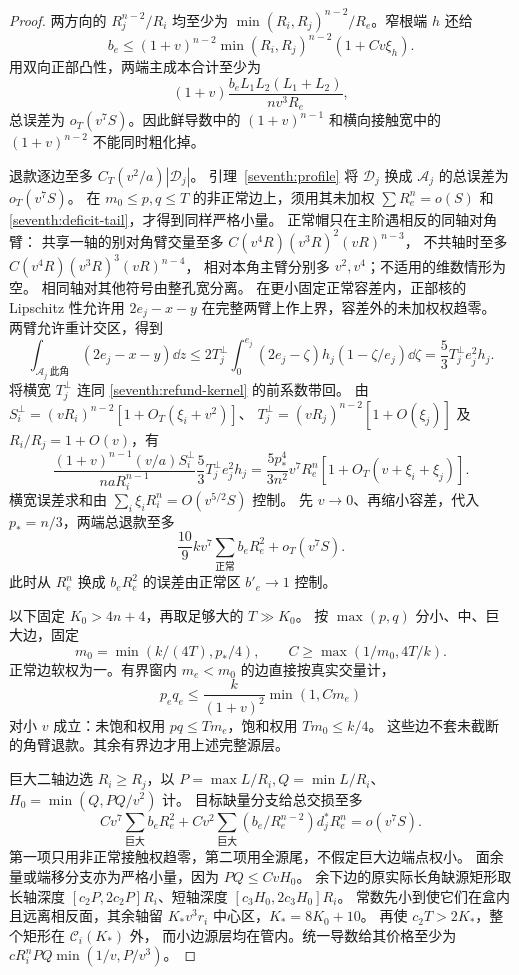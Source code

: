 \begin{proof}
两方向的 \(R_j^{n-2}/R_i\) 均至少为
\(\min(R_i,R_j)^{n-2}/R_e\)。窄根端 \(h\) 还给
\[
 b_e\le(1+v)^{n-2}\min(R_i,R_j)^{n-2}(1+Cv\xi_h).
\]
用双向正部凸性，两端主成本合计至少为
\begin{equation}\label{seventh:pair-cost}
 (1+v)\frac{b_eL_1L_2(L_1+L_2)}{nv^3R_e},
\end{equation}
总误差为 \(o_T(v^7S)\)。因此鲜导数中的 \((1+v)^{n-1}\)
和横向接触宽中的 \((1+v)^{n-2}\) 不能同时粗化掉。

退款逐边至多 \(C_T(v^2/a)|\mathscr D_j|\)。
引理~\ref{seventh:profile} 将 \(\mathscr D_j\) 换成 \(\mathcal A_j\)
的总误差为 \(o_T(v^7S)\)。
在 \(m_0\le p,q\le T\) 的非正常边上，须用其未加权
\(\sum R_e^n=o(S)\) 和 \eqref{seventh:deficit-tail}，才得到同样严格小量。
正常帽只在主阶遇相反的同轴对角臂：
共享一轴的别对角臂交量至多
\(C(v^4R)(v^3R)^2(vR)^{n-3}\)，
不共轴时至多 \(C(v^4R)(v^3R)^3(vR)^{n-4}\)，
相对本角主臂分别多 \(v^2,v^4\)；不适用的维数情形为空。
相同轴对其他符号由整孔宽分离。
在更小固定正常容差内，正部核的 Lipschitz 性允许用
\(2e_j-x-y\) 在完整两臂上作上界，容差外的未加权权趋零。
两臂允许重计交区，得到
\[
 \int_{\mathcal A_j\ \text{此角}}(2e_j-x-y)\dd z\le
 2T_j^\perp\int_0^{e_j}(2e_j-\zeta)h_j(1-\zeta/e_j)\dd\zeta
 =\frac53T_j^\perp e_j^2h_j.
\]
将横宽 \(T_j^\perp\) 连同 \eqref{seventh:refund-kernel} 的前系数带回。
由 \(S_i^\perp=(vR_i)^{n-2}[1+O_T(\xi_i+v^2)]\)、
\(T_j^\perp=(vR_j)^{n-2}[1+O(\xi_j)]\) 及 \(R_i/R_j=1+O(v)\)，有
\[
 \frac{(1+v)^{n-1}(v/a)S_i^\perp}{naR_i^{n-1}}
       \frac53T_j^\perp e_j^2h_j
 =\frac{5p_*^4}{3n^2}v^7R_e^n[1+O_T(v+\xi_i+\xi_j)].
\]
横宽误差求和由 \(\sum_i\xi_iR_i^n=O(v^{5/2}S)\) 控制。
先 \(v\to0\)、再缩小容差，代入 \(p_*=n/3\)，两端总退款至多
\begin{equation}\label{seventh:refund}
 \frac{10}{9}kv^7\sum_\text{正常}b_eR_e^2+o_T(v^7S).
\end{equation}
此时从 \(R_e^n\) 换成 \(b_eR_e^2\) 的误差由正常区 \(b'_e\to1\) 控制。

以下固定 \(K_0>4n+4\)，再取足够大的 \(T\gg K_0\)。
按 \(\max(p,q)\) 分小、中、巨大边，固定
\[
 m_0=\min(k/(4T),p_*/4),\qquad C\ge\max(1/m_0,4T/k).
\]
正常边软权为一。有界窗内 \(m_e<m_0\) 的边直接按真实交量计，
\[
 p_eq_e\le\frac{k}{(1+v)^2}\min(1,Cm_e)
\]
对小 \(v\) 成立：未饱和权用 \(pq\le Tm_e\)，饱和权用 \(Tm_0\le k/4\)。
这些边不套未截断的角臂退款。其余有界边才用上述完整源层。

巨大二轴边选 \(R_i\ge R_j\)，以 \(P=\max L/R_i,Q=\min L/R_i\)、
\(H_0=\min(Q,PQ/v^2)\) 计。
目标缺量分支给总交损至多
\[
 Cv^7\sum_\text{巨大}b_eR_e^2+
 Cv^2\sum_\text{巨大}(b_e/R_e^{n-2})d_j^*R_e^n=o(v^7S).
\]
第一项只用非正常接触权趋零，第二项用全源尾，不假定巨大边端点权小。
面余量或端移分支亦为严格小量，因为 \(PQ\le CvH_0\)。
余下边的原实际长角缺源矩形取长轴深度
\([c_2P,2c_2P]R_i\)、短轴深度 \([c_3H_0,2c_3H_0]R_i\)。
常数先小到使它们在盒内且远离相反面，其余轴留
\(K_*v^3r_i\) 中心区，\(K_*=8K_0+10\)。
再使 \(c_2T>2K_*\)，整个矩形在 \(\mathcal C_i(K_*)\) 外，
而小边源层均在管内。统一导数给其价格至少为
\(cR_i^nPQ\min(1/v,P/v^3)\)。


\end{proof}
